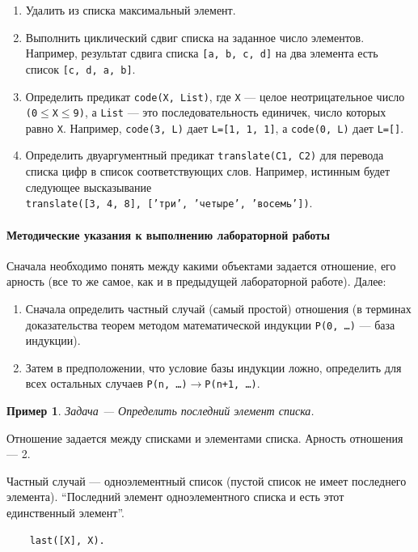 \documentclass[12pt, openany, twoside]{book} %
\newtheorem{example}{Пример}[chapter]
\begin{document}
\begin{enumerate}
\item Удалить из списка максимальный элемент.
\item Выполнить циклический сдвиг списка на заданное число элементов. Например, результат сдвига списка {\tt [a, b, c, d]} на два элемента есть список {\tt [c, d, a, b]}.
\item Определить предикат {\tt code(Х, List)}, где {\tt Х} --- целое неотрицательное число {\tt (0}$\leq${\tt X}$\leq${\tt 9)}, а {\tt List} --- это последовательность  единичек, число  которых  равно  {\tt Х}.  Например, {\tt code(3, L)} дает {\tt L=[1, 1, 1]}, а {\tt code(0, L)} дает {\tt L=[]}.
\item Определить двуаргументный предикат {\tt translate(С1, С2)} для перевода списка цифр в список соответствующих слов. Например, истинным будет следующее высказывание\\
     {\tt translate([3, 4, 8], ['три', 'четыре', 'восемь'])}.
\end{enumerate}

\paragraph{Методические указания к выполнению лабораторной работы}
  Сначала необходимо понять между какими объектами задается отношение, его арность (все то же самое, как и в предыдущей лабораторной работе). Далее:
  \begin{enumerate}
  \item Сначала определить частный случай (самый простой) отношения (в терминах доказательства теорем методом математической индукции {\tt P(0, \ldots)} --- база индукции).
  \item Затем в предположении, что условие базы индукции ложно, определить для всех остальных случаев {\tt P(n, \ldots)$\to$P(n+1, \ldots)}.
  \end{enumerate}

\begin{example}
  Задача --- Определить последний элемент списка.
\end{example}
  Отношение задается между списками и элементами списка. Арность отношения --- 2.

Частный случай --- одноэлементный список (пустой список не имеет последнего элемента). ``Последний элемент одноэлементного списка и есть этот единственный элемент''.

{\tt\begin{verbatim}
    last([X], X).
\end{verbatim}}
\end{document}
